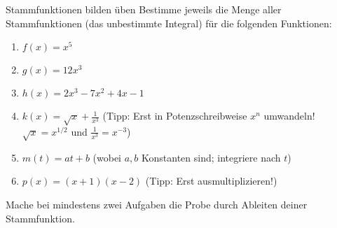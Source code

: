\begin{aufgabenumgebung}{Stammfunktionen bilden üben}
Bestimme jeweils die Menge aller Stammfunktionen (das unbestimmte Integral) für die folgenden Funktionen:
\begin{enumerate}
    \item $f(x) = x^5$
    \item $g(x) = 12x^3$
    \item $h(x) = 2x^3 - 7x^2 + 4x - 1$
    \item $k(x) = \sqrt{x} + \frac{1}{x^3}$ (Tipp: Erst in Potenzschreibweise $x^n$ umwandeln! $\sqrt{x}=x^{1/2}$ und $\frac{1}{x^3}=x^{-3}$)
    \item $m(t) = at+b$ (wobei $a,b$ Konstanten sind; integriere nach $t$)
    \item $p(x) = (x+1)(x-2)$ (Tipp: Erst ausmultiplizieren!)
\end{enumerate}
Mache bei mindestens zwei Aufgaben die Probe durch Ableiten deiner Stammfunktion.
\end{aufgabenumgebung}
